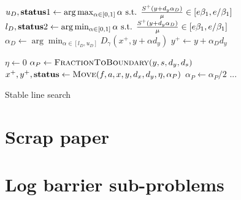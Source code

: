 \documentclass{article}
\begin{document}
\begin{algorithm}[H]
\begin{algorithmic}
\State $u_{D}, \textbf{status}1 \gets \arg \max_{\alpha \in [0,1]} {\alpha} \text{ s.t. } \frac{S^{+} (y + d_{y} \alpha_{D})}{\mu} \in [ e \beta_{1}, e / \beta_{1} ] $
\State $l_{D}, \textbf{status}2 \gets \arg \min_{\alpha \in [0,1]} {\alpha} \text{ s.t. } \frac{S^{+} (y + d_{y} \alpha_{D})}{\mu} \in [ e \beta_{1}, e / \beta_{1} ] $
\State $\alpha_{D} \gets \arg \min_{ \alpha \in [l_{D}, u_{D}] }{ D_{\gamma}(x^{+}, y  + \alpha d_{y} ) }$
\State $y^{+} \gets y + \alpha_{D} d_{y}$
\EndFunction
\end{algorithmic}
\end{algorithm}





\begin{algorithm}[H]
\begin{algorithmic}
\State $\eta \gets 0$
\State $\alpha_{P} \gets \Call{FractionToBoundary}{y, s, d_{y}, d_{s} }$
\State  $x^{+}, y^{+}, \status \gets \Call{Move}{\obj, \cons, x, y, d_{x}, d_{y}, \eta, \alpha_{P}}$
\If{$\status = \feasible$}
\State {}
\Else
\State 
\EndIf
\Else
\State $\alpha_{P} \gets \alpha_{P} /2$
\EndIf
\State ...
\EndFor
\EndFunction
\end{algorithmic}
\caption{Stable line search}
\end{algorithm}



\section{Scrap paper}

\section{Log barrier sub-problems}
\end{document}
